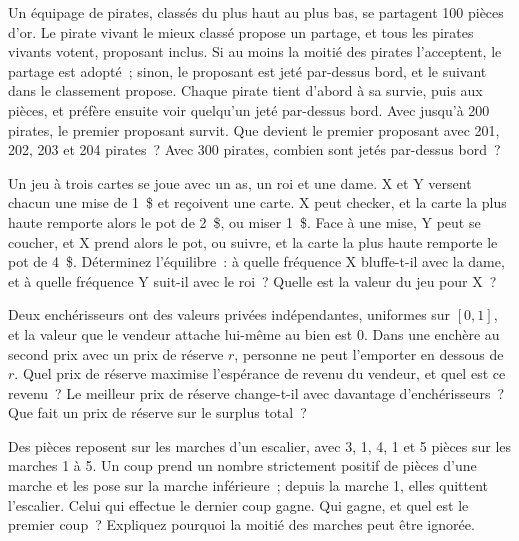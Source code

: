 \begin{question}\label{iq:iv1:games:14}
Un équipage de pirates, classés du plus haut au plus bas, se partagent 100 pièces d'or. Le pirate vivant le mieux classé propose un partage, et tous les pirates vivants votent, proposant inclus. Si au moins la moitié des pirates l'acceptent, le partage est adopté~; sinon, le proposant est jeté par-dessus bord, et le suivant dans le classement propose. Chaque pirate tient d'abord à sa survie, puis aux pièces, et préfère ensuite voir quelqu'un jeté par-dessus bord. Avec jusqu'à 200 pirates, le premier proposant survit. Que devient le premier proposant avec 201, 202, 203 et 204 pirates~? Avec 300 pirates, combien sont jetés par-dessus bord~?
\end{question}

\begin{question}\label{iq:iv1:games:15}
Un jeu à trois cartes se joue avec un as, un roi et une dame. X et Y versent chacun une mise de 1~\$ et reçoivent une carte. X peut checker, et la carte la plus haute remporte alors le pot de 2~\$, ou miser 1~\$. Face à une mise, Y peut se coucher, et X prend alors le pot, ou suivre, et la carte la plus haute remporte le pot de 4~\$. Déterminez l'équilibre~: à quelle fréquence X bluffe-t-il avec la dame, et à quelle fréquence Y suit-il avec le roi~? Quelle est la valeur du jeu pour X~?
\end{question}

\begin{question}\label{iq:iv1:games:16}
Deux enchérisseurs ont des valeurs privées indépendantes, uniformes sur $[0, 1]$, et la valeur que le vendeur attache lui-même au bien est 0. Dans une enchère au second prix avec un prix de réserve $r$, personne ne peut l'emporter en dessous de $r$. Quel prix de réserve maximise l'espérance de revenu du vendeur, et quel est ce revenu~? Le meilleur prix de réserve change-t-il avec davantage d'enchérisseurs~? Que fait un prix de réserve sur le surplus total~?
\end{question}

\begin{question}\label{iq:iv1:games:17}
Des pièces reposent sur les marches d'un escalier, avec 3, 1, 4, 1 et 5 pièces sur les marches 1 à 5. Un coup prend un nombre strictement positif de pièces d'une marche et les pose sur la marche inférieure~; depuis la marche 1, elles quittent l'escalier. Celui qui effectue le dernier coup gagne. Qui gagne, et quel est le premier coup~? Expliquez pourquoi la moitié des marches peut être ignorée.
\end{question}

